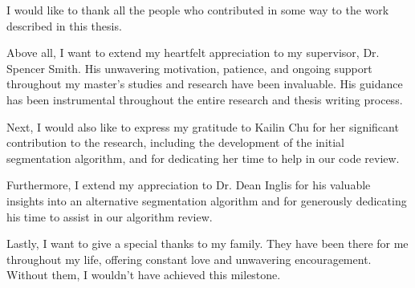 
I would like to thank all the people who contributed in some way to the work described in this thesis.

Above all, I want to extend my heartfelt appreciation to my supervisor, Dr. Spencer Smith. His unwavering motivation, patience, and ongoing support throughout my master's studies and research have been invaluable. His guidance has been instrumental throughout the entire research and thesis writing process.

Next, I would also like to express my gratitude to Kailin Chu for her significant contribution to the research, including the development of the initial segmentation algorithm, and for dedicating her time to help in our code review.

Furthermore, I extend my appreciation to Dr. Dean Inglis for his valuable insights into an alternative segmentation algorithm and for generously dedicating his time to assist in our algorithm review.

Lastly, I want to give a special thanks to my family. They have been there for me throughout my life, offering constant love and unwavering encouragement. Without them, I wouldn't have achieved this milestone.